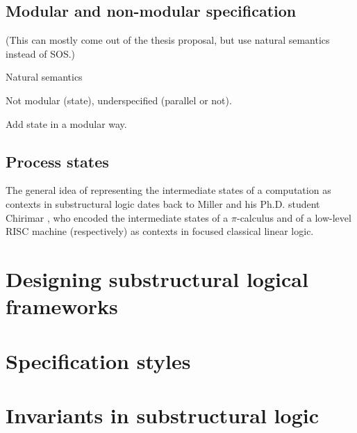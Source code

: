 \subsection{Modular and non-modular specification}
\label{sec:modularnonmodular}

(This can mostly come out of the thesis proposal, but use 
natural semantics instead of SOS.)

Natural semantics

Not modular (state), underspecified (parallel or not).


Add state in a modular way.

\subsection{Process states}

The general idea of representing the
intermediate states of a computation as contexts in substructural
logic dates back to Miller \cite{miller92pi} and his Ph.D. student
Chirimar \cite{chirimar95proof}, who encoded the intermediate states
of a $\pi$-calculus and of a low-level RISC machine (respectively) as
contexts in focused classical linear logic.

\section{Designing substructural logical frameworks}

\section{Specification styles}

\section{Invariants in substructural logic}
